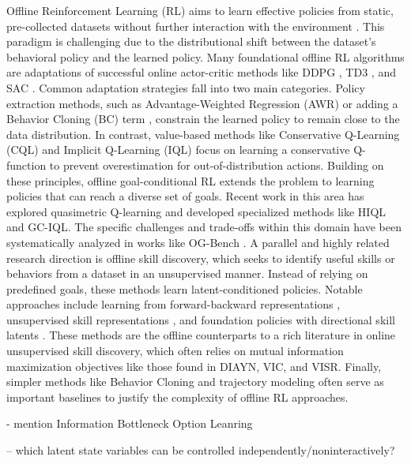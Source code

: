 \documentclass{article}
\theoremstyle{plain}
\theoremstyle{definition}
\theoremstyle{remark}
\begin{document}
Offline Reinforcement Learning (RL) aims to learn effective policies from static, pre-collected datasets without further interaction with the environment \citep{levine2020offline}. 
This paradigm is challenging due to the distributional shift between the dataset's behavioral policy and the learned policy. 
Many foundational offline RL algorithms are adaptations of successful online actor-critic methods like DDPG \citep{silver2014deterministic, lillicrap2019continuouscontroldeepreinforcement}, TD3 \citep{fujimoto2018addressingfunctionapproximationerror}, and SAC \citep{haarnoja2018soft}. 
Common adaptation strategies fall into two main categories. 
Policy extraction methods, such as Advantage-Weighted Regression (AWR) \citep{petersschaal, peng2019advantageweightedregressionsimplescalable} or adding a Behavior Cloning (BC) term \citep{fujimoto2021minimalist}, constrain the learned policy to remain close to the data distribution. 
In contrast, value-based methods like Conservative Q-Learning (CQL) and Implicit Q-Learning (IQL) focus on learning a conservative Q-function to prevent overestimation for out-of-distribution actions.
Building on these principles, offline goal-conditional RL extends the problem to learning policies that can reach a diverse set of goals. 
Recent work in this area has explored quasimetric Q-learning \citep{wang2023optimal} and developed specialized methods like HIQL and GC-IQL. 
The specific challenges and trade-offs within this domain have been systematically analyzed in works like OG-Bench \citep{park2024ogbench, park2024value}.
A parallel and highly related research direction is offline skill discovery, which seeks to identify useful skills or behaviors from a dataset in an unsupervised manner. 
Instead of relying on predefined goals, these methods learn latent-conditioned policies. 
Notable approaches include learning from forward-backward representations \citep{touati}, unsupervised skill representations \citep{borsa}, and foundation policies with directional skill latents \citep{park2024foundation}. 
These methods are the offline counterparts to a rich literature in online unsupervised skill discovery, which often relies on mutual information maximization objectives like those found in DIAYN, VIC, and VISR. 
Finally, simpler methods like Behavior Cloning and trajectory modeling often serve as important baselines to justify the complexity of offline RL approaches.

- mention Information Bottleneck Option Leanring

-- which latent state variables can be controlled independently/noninteractively?
\end{document}
